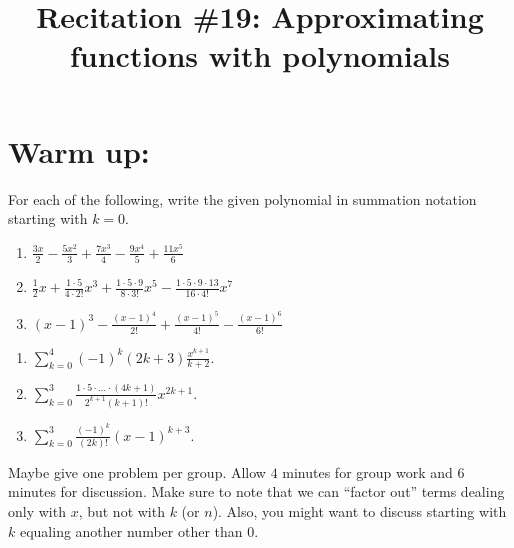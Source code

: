 \documentclass[handout]{ximera}
\title{Recitation \#19: Approximating functions with polynomials}
\begin{document}
\begin{abstract}		\end{abstract}
\maketitle


\section{Warm up:}
For each of the following, write the given polynomial in summation notation starting with $k=0$.
	\begin{enumerate}
	
	\item  $\frac{3x}{2} - \frac{5x^2}{3} + \frac{7x^3}{4} - \frac{9x^4}{5} + \frac{11x^5}{6}$
	
	\item  $\frac{1}{2}x + \frac{1 \cdot 5}{4 \cdot 2!}x^3 + \frac{1 \cdot 5 \cdot 9}{8 \cdot 3!}x^5 - \frac{1 \cdot 5 \cdot 9 \cdot 13}{16 \cdot 4!}x^7$
	
	\item  $(x-1)^3 - \frac{(x-1)^4}{2!} + \frac{(x-1)^5}{4!} - \frac{(x-1)^6}{6!} $
	
	\end{enumerate}
	
	\begin{freeResponse}
	\begin{enumerate}
	
	\item  $\sum_{k=0}^4 (-1)^k (2k+3) \frac{x^{k+1}}{k+2}$.  
	
	\item  $\sum_{k=0}^3 \frac{1 \cdot 5 \cdot \hdots \cdot (4k+1)}{2^{k+1} (k+1)!} x^{2k+1}.$
	
	\item  $\sum_{k=0}^3 \frac{(-1)^k}{(2k)!} (x-1)^{k+3}$.  
	
	\end{enumerate}
	\end{freeResponse}
	
\begin{instructorNotes}
Maybe give one problem per group.  
Allow $4$ minutes for group work and $6$ minutes for discussion.  
Make sure to note that we can ``factor out'' terms dealing only with $x$, but not with $k$ (or $n$).  
Also, you might want to discuss starting with $k$ equaling another number other than $0$.
\end{instructorNotes}
\end{document}
